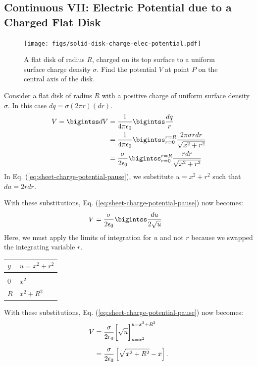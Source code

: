 \documentclass[12pt,b4paper]{article}
\begin{document}
\subsection{Continuous VII: Electric Potential due to a Charged Flat Disk}
\begin{figure}[H]
    \centering
    \texttt{[image: figs/solid-disk-charge-elec-potential.pdf]}
    \caption{A flat disk of radius $R$, charged on its top surface to a uniform surface charge density $\sigma$. Find the potential $V$ at point $P$ on the central axis of the disk.}
    \label{fig:potential-disk-charge}
\end{figure}
Consider a flat disk of radius $R$ with a positive charge of uniform surface density $\sigma$. In this case $dq=\sigma(2\pi r)(dr)$.
\begin{align}
    V=\bigintss dV&=\frac{1}{4\pi\epsilon_0}\bigintss\frac{dq}{r}\notag\\
    &=\frac{1}{4\pi\epsilon_0}\bigintss_{r=0}^{r=R}\frac{2\pi\sigma rdr}{\sqrt{x^2+r^2}}\notag\\
    &=\frac{\sigma}{2\epsilon_0}\bigintss_{r=0}^{r=R}\frac{rdr}{\sqrt{x^2+r^2}}\label{eq:sheet-charge-potential-pause}
\end{align}
In Eq. (\ref{eq:sheet-charge-potential-pause}), we substitute $\displaystyle u=x^2+r^2$ such that $du=2rdr$.

With these substitutions, Eq. (\ref{eq:sheet-charge-potential-pause}) now becomes:
\begin{align}
    V&=\frac{\sigma}{2\epsilon_0}\bigintss\frac{du}{2\sqrt{u}}\notag
\end{align}
Here, we must apply the limits of integration for $u$ and not $r$ because we swapped the integrating variable $r$.
\begin{table}[H]
    \centering
    \begin{tabular}{P{1.0cm}|P{3.0cm}}
    $y$ & $\displaystyle u=x^2+r^2$ \\[8pt]\hline\hline\\
    $0$ & $\displaystyle x^2$\\[12pt]
    $R$ & $x^2+R^2$\\
\end{tabular}
\end{table}
With these substitutions, Eq. (\ref{eq:sheet-charge-potential-pause}) now becomes:
\begin{align}
    V&=\frac{\sigma}{2\epsilon_0}\bigg[\sqrt{u}\bigg]_{u=x^2}^{u=x^2+R^2}\notag\\[6pt]
    &=\frac{\sigma}{2\epsilon_0}\left[\sqrt{x^2+R^2}-x\right].
\end{align}
\end{document}
